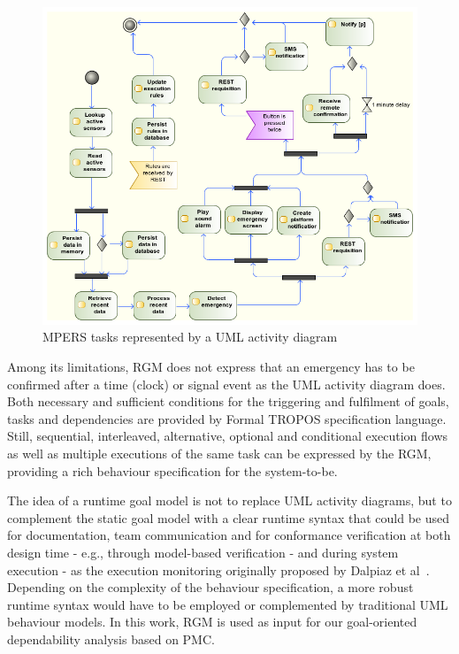 \begin{figure}[h!]
\centering
\includegraphics[width=1\textwidth]{imgs/MPERS_UMLAD.png}
\caption{MPERS tasks represented by a UML activity diagram}
\label{fig:MPERS_UMLAD}
\end{figure}

Among its limitations, RGM does not express that an emergency has to be confirmed after a time (clock) or signal event as the UML activity diagram does. Both necessary and sufficient conditions for the triggering and fulfilment of goals, tasks and dependencies are provided by Formal TROPOS specification language.  Still, sequential, interleaved, alternative, optional and conditional execution flows as well as multiple executions of the same task can be expressed by the RGM, providing a rich behaviour specification for the system-to-be.


The idea of a runtime goal model is not to replace UML activity diagrams, but to complement the static goal model with a clear runtime syntax that could be used for 
documentation, team communication and for conformance verification at both design time - e.g., through model-based verification - and during system execution - as the execution monitoring originally proposed by Dalpiaz et al~\cite{Dalpiaz:2013}. Depending on the complexity of the behaviour specification, a more robust runtime syntax would have to be employed or complemented by traditional UML behaviour models. In this work, RGM is used as input for our goal-oriented dependability analysis based on PMC.

